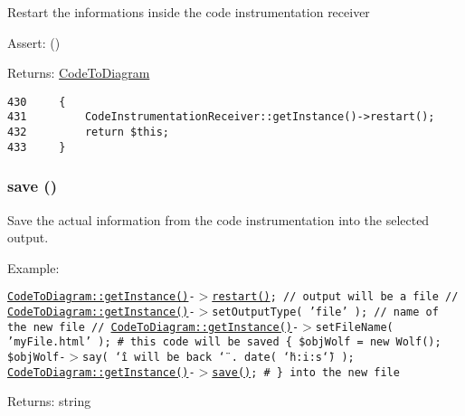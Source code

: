 Restart the informations inside the code instrumentation receiver

\begin{Desc}
\item[Assert:]()\end{Desc}
\begin{Desc}
\item[Returns:]\hyperlink{class_code_to_diagram}{CodeToDiagram} \end{Desc}


\begin{Code}\begin{verbatim}430     {
431         CodeInstrumentationReceiver::getInstance()->restart();
432         return $this;
433     }
\end{verbatim}
\end{Code}


\hypertarget{class_code_to_diagram_fc8a3c62679cf00ade9f15fb2a6d6132}{
\subsubsection[{save}]{\setlength{\rightskip}{0pt plus 5cm}save ()}}
\label{class_code_to_diagram_fc8a3c62679cf00ade9f15fb2a6d6132}


Save the actual information from the code instrumentation into the selected output.

\begin{Desc}
\item[Example:]\end{Desc}
{\tt  \hyperlink{class_code_to_diagram_c93fbec81f07e5d15f80db907e63dc10}{CodeToDiagram::getInstance()}-$>$\hyperlink{class_code_to_diagram_c8de9e38ce27c87f710dff42a13455cf}{restart()}; // output will be a file // \hyperlink{class_code_to_diagram_c93fbec81f07e5d15f80db907e63dc10}{CodeToDiagram::getInstance()}-$>$setOutputType( 'file' ); // name of the new file // \hyperlink{class_code_to_diagram_c93fbec81f07e5d15f80db907e63dc10}{CodeToDiagram::getInstance()}-$>$setFileName( 'myFile.html' ); \# this code will be saved \{ \$objWolf = new Wolf(); \$objWolf-$>$say( \char`\"{}i will be back \char`\"{} . date( \char`\"{}h:i:s\char`\"{}) ); \hyperlink{class_code_to_diagram_c93fbec81f07e5d15f80db907e63dc10}{CodeToDiagram::getInstance()}-$>$\hyperlink{class_code_to_diagram_fc8a3c62679cf00ade9f15fb2a6d6132}{save()}; \# \} into the new file }

\begin{Desc}
\item[Returns:]string \end{Desc}


